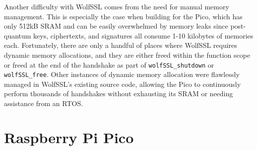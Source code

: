 \documentclass[letterpaper,12pt,titlepage,oneside,final]{book}
\begin{document}
Another difficulty with WolfSSL comes from the need for manual memory management. This is especially the case when building for the Pico, which has only 512kB SRAM and can be easily overwhelmed by memory leaks since post-quantum keys, ciphertexts, and signatures all consume 1-10 kilobytes of memories each. Fortunately, there are only a handful of places where WolfSSL requires dynamic memory allocations, and they are either freed within the function scope or freed at the end of the handshake as part of \texttt{wolfSSL\_shutdown} or \texttt{wolfSSL\_free}. Other instances of dynamic memory allocation were flawlessly managed in WolfSSL's existing source code, allowing the Pico to continuously perform thousands of handshakes without exhausting its SRAM or needing assistance from an RTOS.

\section{Raspberry Pi Pico}




\end{document}
